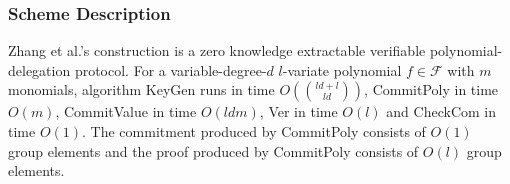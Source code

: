 \subsubsection{Scheme Description}

\begin{theorem} 
\label{thm:zkvpd}
Zhang et al.'s construction \cite{zkvpd} is a zero knowledge extractable verifiable polynomial-delegation protocol. For a variable-degree-$d$ $l$-variate polynomial $f \in \mathcal{F}$ with $m$ monomials, algorithm \textnormal{KeyGen} runs in time $O(\binom{ld+l}{ld})$, \textnormal{CommitPoly} in time $O(m)$, \textnormal{CommitValue} in time $O(ldm)$, \textnormal{Ver} in time $O(l)$ and \textnormal{CheckCom} in time $O(1)$. The commitment produced by \textnormal{CommitPoly} consists of $O(1)$ group elements and the proof produced by \textnormal{CommitPoly} consists of $O(l)$ group elements.
\end{theorem}

